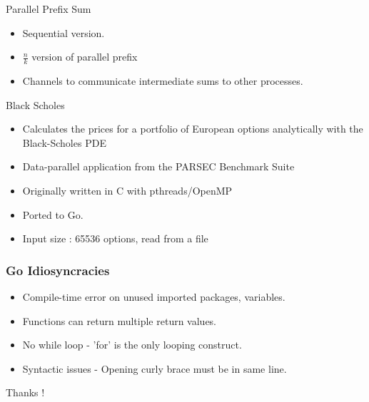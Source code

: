 \documentclass{beamer}
\begin{document}
\begin{frame} {Parallel Prefix Sum}
\begin{itemize}
  \item Sequential version.
  \item $\frac{n}{k}$ version of parallel prefix
  \item Channels to communicate intermediate sums to other processes.
\end{itemize}

\end{frame}

\begin{frame} {Black Scholes}
  \begin{itemize}
   \item Calculates the prices for a portfolio of European options analytically with the Black-Scholes PDE
   \item Data-parallel application from the PARSEC Benchmark Suite
   \item Originally written in C with pthreads/OpenMP
   \item Ported to Go.
   \item Input size : 65536 options, read from a file
  \end{itemize}
\end{frame}

\begin{frame}
  \frametitle{Go Idiosyncracies}
  \begin{itemize}
   \item Compile-time error on unused imported packages, variables.
   \item Functions can return multiple return values.
   \item No while loop - 'for' is the only looping construct.
   \item Syntactic issues - Opening curly brace must be in same line.
  \end{itemize}

\end{frame}

\begin{frame}
\begin{center}
 Thanks !
\end{center}
\end{frame}
\end{document}
